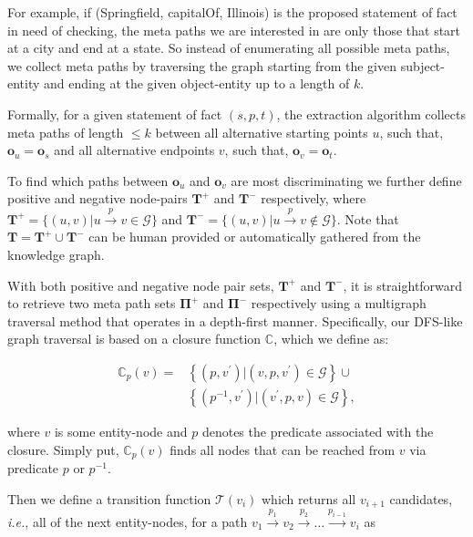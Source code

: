 \documentclass[reprint,twocolumn,showpacs,preprintnumbers,amsmath, aps,pre,amssymb]{revtex4-1}
\newcommand\ie{\emph{i.e.}}
\begin{document}
For example, if (\textsf{Springfield}, \textsf{capitalOf}, \textsf{Illinois}) is the proposed statement of fact in need of checking, the meta paths we are interested in are only those that start at a \textsf{city} and end at a \textsf{state}. So instead of enumerating all possible meta paths, we collect meta paths by traversing the graph starting from the given subject-entity and ending at the given object-entity up to a length of $k$.

Formally, for a given statement of fact $(s, p, t)$, the extraction algorithm collects meta paths of length $\le k$ between all alternative starting points $u$, such that, $\mathbf{o}_u=\mathbf{o}_s$ and all alternative endpoints $v$, such that, $\mathbf{o}_v=\mathbf{o}_t$. 

To find which paths between $\mathbf{o}_u$ and $\mathbf{o}_v$ are most discriminating we further define positive and negative node-pairs $\mathbf{T}^+$ and $\mathbf{T}^-$ respectively, where $\mathbf{T}^+ = \{(u,v)| u \xrightarrow{p} v \in \mathcal{G}\}$ and $\mathbf{T}^- = \{(u,v)| u \xrightarrow{p} v \notin \mathcal{G}\}$. Note that $\mathbf{T} = \mathbf{T}^+ \cup \mathbf{T}^-$ can be human provided or automatically gathered from the knowledge graph.

With both positive and negative node pair sets, $\mathbf{T}^+$ and $\mathbf{T}^-$, it is straightforward to retrieve two meta path sets $\mathbf{\Pi}^{+}$ and $\mathbf{\Pi}^{-}$ respectively using a multigraph traversal method that operates in a depth-first manner. Specifically, our DFS-like graph traversal is based on a closure function $\mathbb{C}$, which we define as:

\begin{equation}
\begin{split}
\mathbb{C}_p(v) = &\left\{(p,v^\prime)|(v,p,v^\prime)\in \mathcal{G}\right\} \cup
\\ & \left\{(p^{-1},v^\prime)|(v^\prime,p,v)\in \mathcal{G}\right\},
\end{split}
\end{equation}

\noindent{}where $v$ is some entity-node and $p$ denotes the predicate associated with the closure. Simply put, $\mathbb{C}_p(v)$ finds all nodes that can be reached from $v$ via predicate $p$ or $p^{-1}$.

Then we define a transition function $\mathcal{T}(v_i)$ which returns all $v_{i+1}$ candidates, \ie, all of the next entity-nodes, for a path $v_1 \xrightarrow{p_1} v_2 \xrightarrow{p_2} \ldots \xrightarrow{p_{i-1}} v_i$ as 
\end{document}
